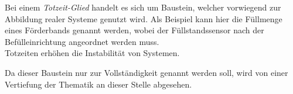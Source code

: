 Bei einem \textit{Totzeit-Glied} handelt es sich um Baustein, welcher vorwiegend zur Abbildung realer Systeme genutzt wird. Als Beispiel kann hier die Füllmenge eines Förderbands genannt werden, wobei der Füllstandssensor nach der Befülleinrichtung angeordnet werden muss.\\
Totzeiten erhöhen die Instabilität von Systemen. 

Da dieser Baustein nur zur Vollständigkeit genannt werden soll, wird von einer Vertiefung der Thematik an dieser Stelle abgesehen.


















